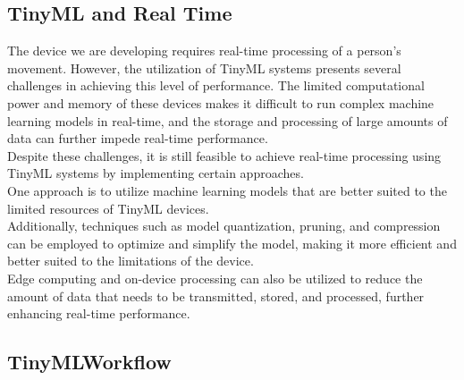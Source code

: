 \subsection{TinyML and Real Time}
The device we are developing requires real-time processing of a person's movement. However, the utilization of TinyML systems presents several challenges in achieving this level of performance. The limited computational power and memory of these devices makes it difficult to run complex machine learning models in real-time, and the storage and processing of large amounts of data can further impede real-time performance. \\
Despite these challenges, it is still feasible to achieve real-time processing using TinyML systems by implementing certain approaches. \\
One approach is to utilize machine learning models that are better suited to the limited resources of TinyML devices.\\
Additionally, techniques such as model quantization, pruning, and compression can be employed to optimize and simplify the model, making it more efficient and better suited to the limitations of the device.\\
Edge computing and on-device processing can also be utilized to reduce the amount of data that needs to be transmitted, stored, and processed, further enhancing real-time performance.

\subsection{TinyMLWorkflow}




